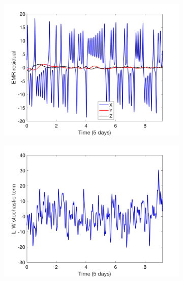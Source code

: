 \documentclass[12pt]{article}
\begin{document}
\begin{figure}[H]
	\centering
	\begin{subfigure}[b]{0.49\textwidth}
		\centering
		\includegraphics[width=\textwidth]{plots/l84l63/emr_residuals_1.png}
	\end{subfigure}
	\hfill
	\begin{subfigure}[b]{0.49\textwidth}
		\centering
		\includegraphics[width=\textwidth]{plots/l84l63/lw_stochastic_term.png}
	\end{subfigure}
	\hfill
	\begin{subfigure}[b]{0.49\textwidth}
		\centering

\end{subfigure}
\end{figure}
\end{document}
